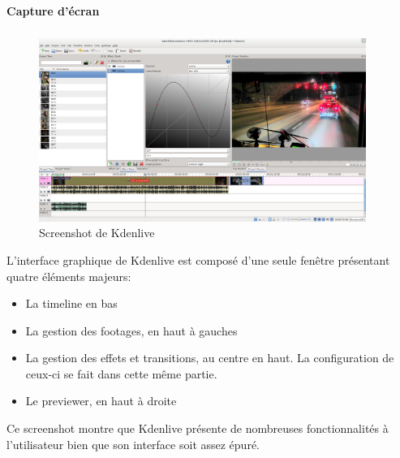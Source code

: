 \paragraph {Capture d'écran}

\subparagraph{}

\begin{figure}[H]

  \begin{center}

    \includegraphics[width=0.95\textwidth]{images/kdenlive}

  \end{center}

  \caption{Screenshot de Kdenlive}

  \label{Yes}

\end{figure}

L'interface graphique de Kdenlive est composé d'une seule fenêtre
présentant quatre éléments majeurs:

\begin{itemize}

  \item {La timeline en bas}

  \item {La gestion des footages, en haut à gauches}

  \item {La gestion des effets et transitions, au centre en haut. La
  configuration de ceux-ci se fait dans cette même partie.}

  \item {Le previewer, en haut à droite}

\end{itemize}


Ce screenshot montre que Kdenlive présente de nombreuses fonctionnalités
à l'utilisateur bien que son interface soit assez épuré.

